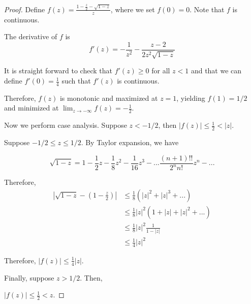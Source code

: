 \documentclass{article}
\begin{document}
\begin{proof}

Define $f(z) = \frac{1 - \frac{z}{2} - \sqrt{ 1 - z}}{z}$, where we set $f(0) = 0$. Note that $f$ is continuous. 

The derivative of $f$ is 
\[
f'(z) = - \frac{1}{z^2} - \frac{z - 2}{2 z^2 \sqrt{1-z}}
\]

It is straight forward to check that $f'(z) \geq 0$ for all $z < 1$ and that we can define $f'(0) = \frac{1}{4}$ such that $f'(z)$ is continuous.

Therefore, $f(z)$ is monotonic and maximized at $z = 1$, yielding $f(1) = 1/2$ and minimized at $\lim_{z \rightarrow -\infty} f(z) = -\frac{1}{2}$. 

Now we perform case analysis. Suppose $z < -1/2$, then $|f(z)| \leq \frac{1}{2} < |z|$.

Suppose $-1/2 \leq z \leq 1/2$. By Taylor expansion, we have

\[
\sqrt{1 - z} = 1 - \frac{1}{2} z - \frac{1}{8} z^2 - \frac{1}{16} z^3  - ... \frac{(n+1)!!}{2^n n!} z^n - ... 
\]


Therefore,
\begin{align*}
\left| \sqrt{1-z} - (1 - \frac{z}{2}) \right| &\leq
     \frac{1}{8} (|z|^2 + |z|^3 + ... ) \\
  &\leq \frac{1}{8} |z|^2 ( 1 + |z| + |z|^2 + ...) \\
  &\leq \frac{1}{8} |z|^2 \frac{1}{1 - |z|} \\
  &\leq \frac{1}{4} |z|^2 
\end{align*}

Therefore, $|f(z)| \leq \frac{1}{4} |z|$. 

Finally, suppose $z > 1/2$. Then, 

$|f(z)| \leq \frac{1}{2} < z$. 




\end{proof}
\end{document}
